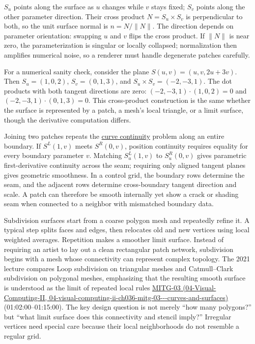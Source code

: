 \(S_u\) points along the surface as \(u\) changes while \(v\) stays fixed; \(S_v\) points along the other parameter direction. Their cross product \(N=S_u\times S_v\) is perpendicular to both, so the unit surface normal is \(n=N/\|N\|\). The direction depends on parameter orientation: swapping \(u\) and \(v\) flips the cross product. If \(\|N\|\) is near zero, the parameterization is singular or locally collapsed; normalization then amplifies numerical noise, so a renderer must handle degenerate patches carefully.

For a numerical sanity check, consider the plane \(S(u,v)=(u,v,2u+3v)\). Then \(S_u=(1,0,2)\), \(S_v=(0,1,3)\), and \(S_u\times S_v=(-2,-3,1)\). The dot products with both tangent directions are zero: \((-2,-3,1)\cdot(1,0,2)=0\) and \((-2,-3,1)\cdot(0,1,3)=0\). This cross-product construction is the same whether the surface is represented by a patch, a mesh's local triangle, or a limit surface, though the derivative computation differs.

Joining two patches repeats the \hyperref[appendix-f28eeec97a3d]{curve continuity} problem along an entire boundary. If \(S^L(1,v)\) meets \(S^R(0,v)\), position continuity requires equality for every boundary parameter \(v\). Matching \(S^L_u(1,v)\) to \(S^R_u(0,v)\) gives parametric first-derivative continuity across the seam; requiring only aligned tangent planes gives geometric smoothness. In a control grid, the boundary rows determine the seam, and the adjacent rows determine cross-boundary tangent direction and scale. A patch can therefore be smooth internally yet show a crack or shading seam when connected to a neighbor with mismatched boundary data.

Subdivision surfaces start from a coarse polygon mesh and repeatedly refine it. A typical step splits faces and edges, then relocates old and new vertices using local weighted averages. Repetition makes a smoother limit surface. Instead of requiring an artist to lay out a clean rectangular patch network, subdivision begins with a mesh whose connectivity can represent complex topology. The 2021 lecture compares Loop subdivision on triangular meshes and Catmull--Clark subdivision on polygonal meshes, emphasizing that the resulting smooth surface is understood as the limit of repeated local rules \href{../04-Visual-Computing-II/main.pdf\#nameddest=04-visual-computing-ii-ch036-mitg-03---curves-and-surfaces}{MITG-03 (04-Visual-Computing-II, 04-visual-computing-ii-ch036-mitg-03-\/-\/-curves-and-surfaces)} (01:02:00--01:15:00). The key design question is not merely ``how many polygons?'' but ``what limit surface does this connectivity and stencil imply?'' Irregular vertices need special care because their local neighborhoods do not resemble a regular grid.

